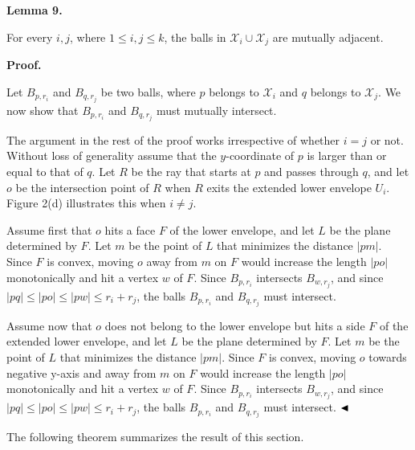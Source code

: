 \par
\par
\par\medskip\noindent\textbf{Lemma 9.}\par
For every $i,j$, where $1\leq i,j\leq k$, the balls in $\mathcal{X}_{i}\cup\mathcal{X}_{j}$ are mutually adjacent.
\par
\par
\par
\par
\par\medskip\noindent\textbf{Proof.}\par
Let $B_{p,r_{i}}$ and $B_{q,r_{j}}$ be two balls, where $p$ belongs to $\mathcal{X}_{i}$ and $q$ belongs to $\mathcal{X}_{j}$. We now show that $B_{p,r_{i}}$ and $B_{q,r_{j}}$ must mutually intersect.
\par
\par
The argument in the rest of the proof works irrespective of whether $i=j$ or not. Without loss of generality assume that the $y$-coordinate of $p$ is larger than or equal to that of $q$. Let $R$ be the ray that starts at $p$ and passes through $q$, and let $o$ be the intersection point of $R$ when $R$ exits the extended lower envelope $U_{i}$. Figure 2(d) illustrates this when $i\not=j$.
\par
\par
Assume first that $o$ hits a face $F$ of the lower envelope, and let $L$ be the plane determined by $F$. Let $m$ be the point of $L$ that minimizes the distance $|pm|$. Since $F$ is convex, moving $o$ away from $m$ on $F$ would increase the length $|po|$ monotonically and hit a vertex $w$ of $F$. Since $B_{p,r_{i}}$ intersects $B_{w,r_{j}}$, and since $|pq|\leq|po|\leq|pw|\leq r_{i}+r_{j}$, the balls $B_{p,r_{i}}$ and $B_{q,r_{j}}$ must intersect.
\par
\par
Assume now that $o$ does not belong to the lower envelope but hits a side $F$ of the extended lower envelope, and let $L$ be the plane determined by $F$. Let $m$ be the point of $L$ that minimizes the distance $|pm|$. Since $F$ is convex, moving $o$ towards negative y-axis and away from $m$ on $F$ would increase the length $|po|$ monotonically and hit a vertex $w$ of $F$. Since $B_{p,r_{i}}$ intersects $B_{w,r_{j}}$, and since $|pq|\leq|po|\leq|pw|\leq r_{i}+r_{j}$, the balls $B_{p,r_{i}}$ and $B_{q,r_{j}}$ must intersect. $\hfill\blacktriangleleft$
\par
\par
The following theorem summarizes the result of this section.
